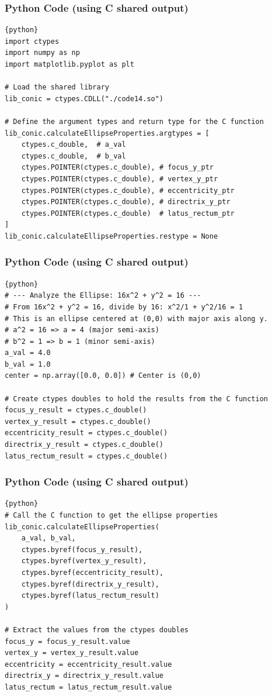 \documentclass{beamer}
\begin{document}
\begin{frame}[fragile]
\frametitle{Python Code (using C shared output)}
\begin{lstlisting}{python}
import ctypes
import numpy as np
import matplotlib.pyplot as plt

# Load the shared library
lib_conic = ctypes.CDLL("./code14.so") 

# Define the argument types and return type for the C function
lib_conic.calculateEllipseProperties.argtypes = [
    ctypes.c_double,  # a_val
    ctypes.c_double,  # b_val
    ctypes.POINTER(ctypes.c_double), # focus_y_ptr
    ctypes.POINTER(ctypes.c_double), # vertex_y_ptr
    ctypes.POINTER(ctypes.c_double), # eccentricity_ptr
    ctypes.POINTER(ctypes.c_double), # directrix_y_ptr
    ctypes.POINTER(ctypes.c_double)  # latus_rectum_ptr
]
lib_conic.calculateEllipseProperties.restype = None
\end{lstlisting}
\end{frame}

\begin{frame}[fragile]
\frametitle{Python Code (using C shared output)}
\begin{lstlisting}{python}
# --- Analyze the Ellipse: 16x^2 + y^2 = 16 ---
# From 16x^2 + y^2 = 16, divide by 16: x^2/1 + y^2/16 = 1
# This is an ellipse centered at (0,0) with major axis along y.
# a^2 = 16 => a = 4 (major semi-axis)
# b^2 = 1 => b = 1 (minor semi-axis)
a_val = 4.0
b_val = 1.0
center = np.array([0.0, 0.0]) # Center is (0,0)

# Create ctypes doubles to hold the results from the C function
focus_y_result = ctypes.c_double()
vertex_y_result = ctypes.c_double()
eccentricity_result = ctypes.c_double()
directrix_y_result = ctypes.c_double()
latus_rectum_result = ctypes.c_double()
\end{lstlisting}
\end{frame}

\begin{frame}[fragile]
\frametitle{Python Code (using C shared output)}
\begin{lstlisting}{python}
# Call the C function to get the ellipse properties
lib_conic.calculateEllipseProperties(
    a_val, b_val,
    ctypes.byref(focus_y_result),
    ctypes.byref(vertex_y_result),
    ctypes.byref(eccentricity_result),
    ctypes.byref(directrix_y_result),
    ctypes.byref(latus_rectum_result)
)

# Extract the values from the ctypes doubles
focus_y = focus_y_result.value
vertex_y = vertex_y_result.value
eccentricity = eccentricity_result.value
directrix_y = directrix_y_result.value
latus_rectum = latus_rectum_result.value
\end{lstlisting}
\end{frame}
\end{document}
